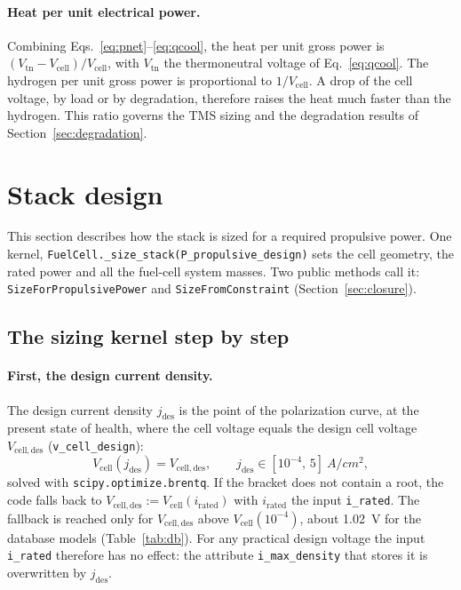 \documentclass[a4paper,11pt]{article}
\newcommand{\code}[1]{\nolinkurl{#1}}
\newcommand{\fn}[1]{\nolinkurl{#1}}
\newcommand{\jdes}{j_\mathrm{des}}
\newcommand{\Vdes}{V_\mathrm{cell,des}}
\begin{document}
\paragraph{Heat per unit electrical power.} Combining Eqs.~\eqref{eq:pnet}--\eqref{eq:qcool},
the heat per unit gross power is $(V_\mathrm{tn}-V_\mathrm{cell})/V_\mathrm{cell}$, with
$V_\mathrm{tn}$ the thermoneutral voltage of Eq.~\eqref{eq:qcool}. The hydrogen per unit gross
power is proportional to $1/V_\mathrm{cell}$. A drop of the cell voltage, by load or by
degradation, therefore raises the heat much faster than the hydrogen. This ratio governs the
TMS sizing and the degradation results of Section~\ref{sec:degradation}.

\section{Stack design}
\label{sec:design}

This section describes how the stack is sized for a required propulsive power. One kernel,
\fn{FuelCell._size_stack(P_propulsive_design)} sets the
cell geometry, the rated power and all the fuel-cell system masses. Two public methods call
it: \fn{SizeForPropulsivePower} and \fn{SizeFromConstraint} (Section~\ref{sec:closure}).

\subsection{The sizing kernel step by step}

\paragraph{First, the design current density.} The design current density $\jdes$ is the
point of the polarization curve, at the present state of health, where the cell voltage equals
the design cell voltage $\Vdes$ (\code{v_cell_design}):
\begin{equation}
  V_\mathrm{cell}(\jdes) = \Vdes, \qquad \jdes\in[10^{-4},\,5]\ \si{A/cm^2},
\end{equation}
solved with \fn{scipy.optimize.brentq}. If the bracket does not contain a root, the code
falls back to $\Vdes := V_\mathrm{cell}(i_\mathrm{rated})$ with $i_\mathrm{rated}$ the input
\code{i_rated}. The fallback is reached only for $\Vdes$ above $V_\mathrm{cell}(10^{-4})$,
about \SI{1.02}{V} for the database models (Table~\ref{tab:db}). For any practical design
voltage the input \code{i_rated} therefore has no effect: the attribute
\code{i_max_density} that stores it is overwritten by $\jdes$.
\end{document}
